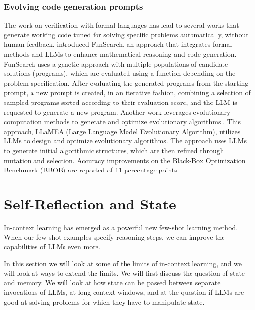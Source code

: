\subsubsection{Evolving code generation prompts}
The work on verification with formal languages has lead to several works that generate working code tuned for solving specific problems automatically, without human feedback.
\citet{romera2024mathematical} introduced FunSearch, an approach that integrates formal methods and LLMs to enhance mathematical reasoning and code generation. FunSearch %
uses a genetic  approach with multiple populations of candidate solutions (programs), which are  evaluated using a function depending on the problem specification. %
After evaluating the  generated programs from the starting prompt, a new prompt  is created, in an iterative fashion, combining a selection of  sampled programs sorted  according to their evaluation score, and the LLM is requested to generate a new program.
Another work  leverages evolutionary computation methods to generate and optimize evolutionary algorithms \citep{van2024llamea}. This approach, LLaMEA (Large Language Model Evolutionary Algorithm),  utilizes LLMs to  design and optimize  evolutionary algorithms. The approach uses LLMs to generate initial algorithmic structures, which are then refined through  mutation and selection. %
Accuracy improvements  on the  Black-Box Optimization Benchmark (BBOB) \citep{hansen2010black}   are reported of 11 percentage points.




\section{Self-Reflection and State}\label{sec:state}
In-context learning has emerged as a powerful new few-shot learning method. When our few-shot examples specify reasoning steps, we can improve the capabilities of LLMs even more. 

In this section we will look at some of the limits of in-context learning,
and we will look at ways to extend the limits.
%
We will first discuss the question of state and memory. We will look at how state can be passed between separate invocations of LLMs, at long context windows, and at the question if LLMs are good at solving problems for which they have to manipulate state. %




